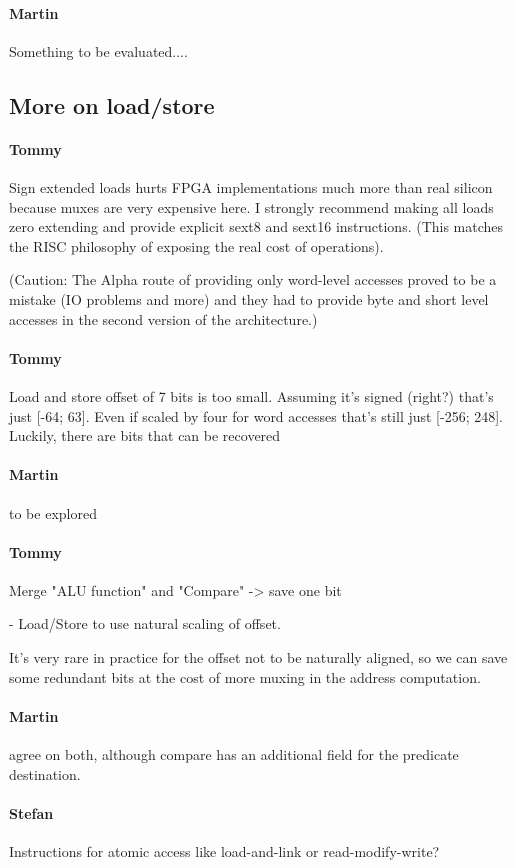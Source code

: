 \documentclass{IEEEtran}
\newcommand{\comment}[3]{\paragraph*{\textbf{#1}}{\color{#3}#2}}
\newcommand{\tommy}[1]{\comment{Tommy}{#1}{Red}}
\newcommand{\martin}[1]{\comment{Martin}{#1}{Blue}}
\newcommand{\stefan}[1]{\comment{Stefan}{#1}{RoyalPurple}}
\begin{document}
\martin{Something to be evaluated....}


\subsection{More on load/store}

\tommy{Sign extended loads hurts FPGA implementations much more than real
silicon because muxes are very expensive here. I strongly recommend
making all loads zero extending and provide explicit sext8 and sext16
instructions. (This matches the RISC philosophy of exposing the real
cost of operations).

(Caution: The Alpha route of providing only word-level accesses proved to be a mistake (IO
problems and more) and they had to provide byte and short level accesses
in the second version of the architecture.)}

\tommy{
Load and store offset of 7 bits is too small. Assuming it's signed
(right?) that's just [-64; 63]. Even if scaled by four for word
accesses that's still just [-256; 248]. Luckily, there are bits that can
be recovered}

\martin{to be explored}

\tommy{ Merge "ALU function" and "Compare" -> save one bit

- Load/Store to use natural scaling of offset.

 It's very rare in practice for the offset not to be naturally
 aligned, so we can save some redundant bits at the cost of more
 muxing in the address computation.}

 \martin{agree on both, although compare has an additional field for
 the predicate destination.}

\stefan{Instructions for atomic access like load-and-link or read-modify-write?}
\end{document}
